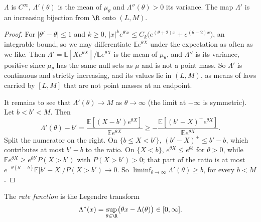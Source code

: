 \begin{lemma}\label{lem:Lambda}
$\Lambda$ is $C^\infty$, $\Lambda'(\theta)$ is the mean of $\mu_\theta$ and $\Lambda''(\theta)>0$ its variance. The map $\Lambda'$ is an increasing bijection from $\R$ onto $(L,M)$.
\end{lemma}
\begin{proof}
For $|\theta'-\theta|\le1$ and $k\ge0$, $|x|^ke^{\theta'x}\le C_k\bigl(e^{(\theta+2)x}+e^{(\theta-2)x}\bigr)$, an integrable bound, so we may differentiate $\mathbb Ee^{\theta X}$ under the
expectation as often as we like. Then $\Lambda'=\mathbb E[Xe^{\theta X}]/\mathbb Ee^{\theta X}$ is the mean of $\mu_\theta$, and $\Lambda''$ is its variance, positive since $\mu_\theta$ has the same null sets as
$\mu$ and is not a point mass. So $\Lambda'$ is continuous and strictly increasing, and its values lie in $(L,M)$, as means of laws carried by $[L,M]$ that are not point masses at
an endpoint.

It remains to see that $\Lambda'(\theta)\to M$ as $\theta\to\infty$ (the limit at $-\infty$ is symmetric). Let $b<b'<M$. Then
\[
\Lambda'(\theta)-b'=\frac{\mathbb E[(X-b')e^{\theta X}]}{\mathbb Ee^{\theta X}}\ge-\frac{\mathbb E[(b'-X)^+e^{\theta X}]}{\mathbb Ee^{\theta X}}.
\]
Split the numerator on the right. On $\{b\le X<b'\}$, $(b'-X)^+\le b'-b$, which contributes at most $b'-b$ to the ratio. On $\{X<b\}$, $e^{\theta X}\le e^{\theta b}$ for $\theta>0$,
while $\mathbb Ee^{\theta X}\ge e^{\theta b'}P(X>b')$ with $P(X>b')>0$; that part of the ratio is at most $e^{-\theta(b'-b)}\mathbb E|b'-X|/P(X>b')\to0$. So
$\liminf_{\theta\to\infty}\Lambda'(\theta)\ge b$, for every $b<M$.
\end{proof}

The \emph{rate function} is the Legendre transform
\[
\Lambda^*(x)=\sup_{\theta\in\R}\bigl(\theta x-\Lambda(\theta)\bigr)\in[0,\infty].
\]

